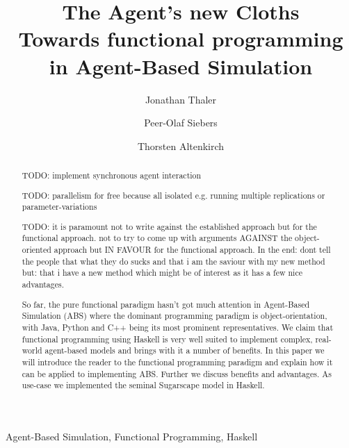 \documentclass{JASSS}
\title{The Agent's new Cloths \\ {\large Towards functional programming in Agent-Based Simulation}}
\author[1]{Jonathan Thaler}
\author[1]{Peer-Olaf Siebers}
\author[1]{Thorsten Altenkirch}
\affil[1]{University of Nottingham, 7301 Wollaton Rd, Nottingham, NG8 1BB, United Kingdom}
\begin{document}
\maketitle 



\begin{abstract}
TODO: implement synchronous agent interaction

TODO: parallelism for free because all isolated e.g. running multiple replications or parameter-variations

TODO: it is paramount not to write against the established approach but for the functional approach. not to try to come up with arguments AGAINST the object-oriented approach but IN FAVOUR for the functional approach. In the end: dont tell the people that what they do sucks and that i am the saviour with my new method but: that i have a new method which might be of interest as it has a few nice advantages.

So far, the pure functional paradigm hasn't got much attention in Agent-Based Simulation (ABS) where the dominant programming paradigm is object-orientation, with Java, Python and C++ being its most prominent representatives. We claim that functional programming using Haskell is very well suited to implement complex, real-world agent-based models and brings with it a number of benefits. In this paper we will introduce the reader to the functional programming paradigm and explain how it can be applied to implementing ABS. Further we discuss benefits and advantages. As use-case we implemented the seminal Sugarscape model in Haskell.
\end{abstract}

\begin{keywords}
Agent-Based Simulation, Functional Programming, Haskell
\end{keywords}

\parano{}










\end{document}
